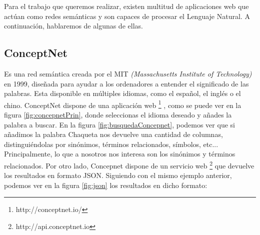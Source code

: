 Para el trabajo que queremos realizar, existen multitud de aplicaciones web que actúan como redes semánticas y son capaces de procesar el Lenguaje Natural.  A continuación, hablaremos de algunas de ellas.

\subsection{ConceptNet} 
\label{cap:subsec:concepnet}

Es una red semántica creada por el MIT \textit{(Massachusetts Institute of Technology)} en 1999, diseñada para ayudar a los ordenadores a entender el significado de las palabras. Esta disponible en múltiples idiomas, como el español, el inglés o el chino. ConceptNet dispone de una aplicación web \footnote{http://conceptnet.io/} , como se puede ver en la figura \ref{fig:concepnetPrin}, donde seleccionas el idioma deseado y añades la palabra a buscar.  En la figura  \ref{fig:busquedaConcepnet}, podemos ver que si añadimos la palabra Chaqueta nos devuelve una cantidad de columnas, distinguiéndolas por sinónimos, términos relacionados, símbolos, etc... Principalmente, lo que a nosotros nos interesa son los sinónimos y términos relacionados.   
Por otro lado, Concepnet dispone de un servicio web \footnote{http://api.conceptnet.io} que devuelve los resultados en formato JSON. Siguiendo con el mismo ejemplo anterior, podemos ver en la figura  \ref{fig:json} los resultados en dicho formato:



